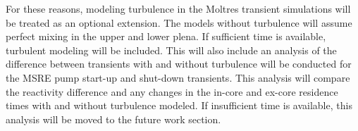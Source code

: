 For these reasons, modeling turbulence in the Moltres transient simulations will be treated as an optional extension.
The models without turbulence will assume perfect mixing in the upper and lower plena.
If sufficient time is available, turbulent modeling will be included.
This will also include an analysis of the difference between transients with and without turbulence will be conducted for the \gls{MSRE} pump start-up and shut-down transients.
This analysis will compare the reactivity difference and any changes in the in-core and ex-core residence times with and without turbulence modeled.
If insufficient time is available, this analysis will be moved to the future work section.